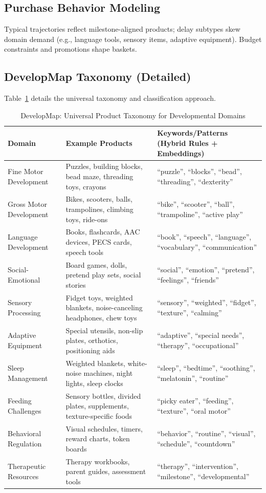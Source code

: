 \documentclass[conference]{IEEEtran}
\theoremstyle{plain}
\theoremstyle{remark}
\begin{document}
\subsection{Purchase Behavior Modeling}
Typical trajectories reflect milestone-aligned products; delay subtypes skew domain demand (e.g., language tools, sensory items, adaptive equipment). Budget constraints and promotions shape baskets.

\subsection{DevelopMap Taxonomy (Detailed)}
Table~\ref{tab:developmap} details the universal taxonomy and classification approach.

\begin{table}[t]
\centering
\caption{DevelopMap: Universal Product Taxonomy for Developmental Domains}
\label{tab:developmap}
\begin{tabular}{p{3.2cm}p{7.8cm}p{5.5cm}}
\toprule
\textbf{Domain} & \textbf{Example Products} & \textbf{Keywords/Patterns (Hybrid Rules + Embeddings)}\\
\midrule
Fine Motor Development & Puzzles, building blocks, bead maze, threading toys, crayons & ``puzzle'', ``blocks'', ``bead'', ``threading'', ``dexterity'' \\
Gross Motor Development & Bikes, scooters, balls, trampolines, climbing toys, ride-ons & ``bike'', ``scooter'', ``ball'', ``trampoline'', ``active play'' \\
Language Development & Books, flashcards, AAC devices, PECS cards, speech tools & ``book'', ``speech'', ``language'', ``vocabulary'', ``communication'' \\
Social-Emotional & Board games, dolls, pretend play sets, social stories & ``social'', ``emotion'', ``pretend'', ``feelings'', ``friends'' \\
Sensory Processing & Fidget toys, weighted blankets, noise-canceling headphones, chew toys & ``sensory'', ``weighted'', ``fidget'', ``texture'', ``calming'' \\
Adaptive Equipment & Special utensils, non-slip plates, orthotics, positioning aids & ``adaptive'', ``special needs'', ``therapy'', ``occupational'' \\
Sleep Management & Weighted blankets, white-noise machines, night lights, sleep clocks & ``sleep'', ``bedtime'', ``soothing'', ``melatonin'', ``routine'' \\
Feeding Challenges & Sensory bottles, divided plates, supplements, texture-specific foods & ``picky eater'', ``feeding'', ``texture'', ``oral motor'' \\
Behavioral Regulation & Visual schedules, timers, reward charts, token boards & ``behavior'', ``routine'', ``visual'', ``schedule'', ``countdown'' \\
Therapeutic Resources & Therapy workbooks, parent guides, assessment tools & ``therapy'', ``intervention'', ``milestone'', ``developmental'' \\
\bottomrule
\end{tabular}
\end{table}
\end{document}
